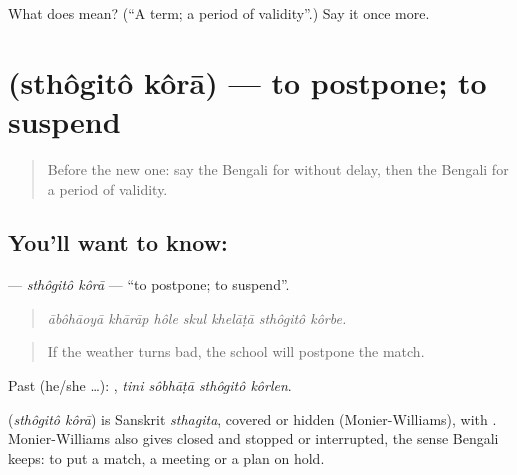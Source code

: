 \begin{tcolorbox}[breakable,colback=teal!4,colframe=teal!35!black,title={Before you move on}]
What does  mean? (\textquotedblleft{}A term; a period of validity\textquotedblright{}.) Say it once more.
\end{tcolorbox}
\section[\texorpdfstring{\bn{স্থগিত} \bn{করা} (sthôgitô kôrā)}{স্থগিত করা (sthôgitô kôrā)}]{  (sthôgitô kôrā) — to postpone; to suspend}

\label{lesson:BN-C378-sthogito-kora}



\begin{quote}
Before the new one: say the Bengali for without delay, then the Bengali for a period of validity.
\end{quote}

\subsection*{You'll want to know:  }
\textbf{ } — \emph{sthôgitô kôrā} — \textquotedblleft{}to postpone; to suspend\textquotedblright{}.

\begin{quote}
      
\end{quote}

\begin{quote}
\emph{ābôhāoyā khārāp hôle skul khelāṭā sthôgitô kôrbe.}
\end{quote}

\begin{quote}
If the weather turns bad, the school will postpone the match.
\end{quote}

Past (he/she …):    , \emph{tini sôbhāṭā sthôgitô kôrlen}.

\begin{cousinweb}
\textbf{ } (\emph{sthôgitô kôrā}) is Sanskrit \emph{sthagita}, covered or hidden (Monier-Williams), with . Monier-Williams also gives closed and stopped or interrupted, the sense Bengali keeps: to put a match, a meeting or a plan on hold.
\end{cousinweb}

